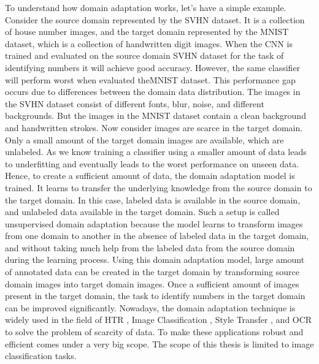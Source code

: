 To understand how domain adaptation works, let's have a simple example. Consider the source domain represented by the \ac{SVHN} dataset. It is a collection of house number images, and the target domain represented by the \ac{MNIST} dataset, which is a collection of handwritten digit images.  When the \ac{CNN} is trained and evaluated on the source domain \ac{SVHN} dataset for the task of identifying numbers it will achieve good accuracy. However, the same classifier will perform worst when evaluated the\ac{MNIST} dataset. This performance gap occurs due to differences between the domain data distribution. The images in the \ac{SVHN} dataset consist of different fonts, blur, noise, and different backgrounds. But the images in the \ac{MNIST} dataset contain a clean background and handwritten strokes. Now consider images are scarce in the target domain. Only a small amount of the target domain images are available, which are unlabeled. As we know training a classifier using a smaller amount of data leads to underfitting and eventually leads to the worst performance on unseen data. Hence, to create a sufficient amount of data, the domain adaptation model is trained. It learns to transfer the underlying knowledge from the source domain to the target domain. In this case, labeled data is available in the source domain, and unlabeled data available in the target domain. Such a setup is called unsupervised domain adaptation because the model learns to transform images from one domain to another in the absence of labeled data in the target domain, and without taking much help from the labeled data from the source domain during the learning process. Using this domain adaptation model, large amount of annotated data can be created in the target domain by transforming source domain images into target domain images. Once a sufficient amount of images present in the target domain, the task to identify numbers in the target domain can be improved significantly. Nowadays, the domain adaptation technique is widely used in the field of \ac{HTR} \cite{Kang_2020}, Image Classification \cite{5288526}, Style Transfer \cite{johnson2016perceptual}, and \ac{OCR} \cite{8978011} to solve the problem of scarcity of data. To make these applications robust and efficient comes under a very big scope. The scope of this thesis is limited to image classification tasks.


